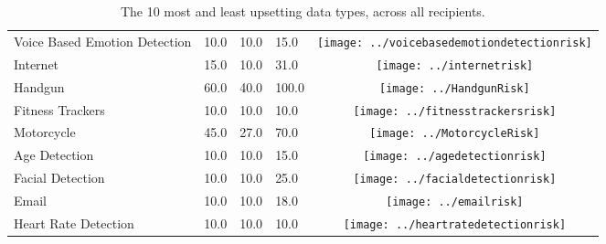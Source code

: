\begin{table}[t]
\begin{center}
\begin{tabular}{| p{2cm} | p{1cm} | p{1cm} | p{1cm} | c |}
Voice Based Emotion Detection & 10.0 & 10.0 & 15.0 & \texttt{[image: ../voicebasedemotiondetectionrisk]} \\ 
Internet & 15.0 & 10.0 & 31.0 & \texttt{[image: ../internetrisk]} \\ 
Handgun & 60.0 & 40.0 & 100.0 & \texttt{[image: ../HandgunRisk]} \\ 
Fitness Trackers & 10.0 & 10.0 & 10.0 & \texttt{[image: ../fitnesstrackersrisk]} \\ 
Motorcycle & 45.0 & 27.0 & 70.0 & \texttt{[image: ../MotorcycleRisk]} \\ 
Age Detection & 10.0 & 10.0 & 15.0 & \texttt{[image: ../agedetectionrisk]} \\ 
Facial Detection & 10.0 & 10.0 & 25.0 & \texttt{[image: ../facialdetectionrisk]} \\ 
Email & 10.0 & 10.0 & 18.0 & \texttt{[image: ../emailrisk]} \\ 
Heart Rate Detection & 10.0 & 10.0 & 10.0 & \texttt{[image: ../heartratedetectionrisk]} \\ 
\hline
\end{tabular}
\caption{The 10 most and least upsetting data types, across all recipients.}
\label{top10}
\end{center}
\end{table}
